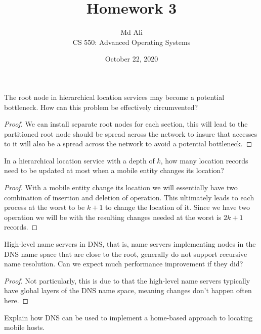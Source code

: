 \documentclass[12pt]{article}
\newenvironment{exercise}[2][Exercise]{\begin{trivlist}
\item[\hskip \labelsep {\bfseries #1}\hskip \labelsep {\bfseries #2.}]}{\end{trivlist}}
\begin{document}
 
\title{Homework 3}
\author{Md Ali\\ 
CS 550: Advanced Operating Systems}
\date{October 22, 2020}
\maketitle

 
\begin{exercise}{1}
The root node in hierarchical location services may become a potential bottleneck. How can this problem be effectively circumvented?
\end{exercise} 

\begin{proof}
We can install separate root nodes for each section, this will lead to the partitioned root node should be spread across the network to insure that accesses to it will also be a spread across the network to avoid a potential bottleneck.
\end{proof}
 
\begin{exercise}{2}
In a hierarchical location service with a depth of $k$, how many location records need to be updated at most when a mobile entity changes its location?
\end{exercise}
 
\begin{proof}
With a mobile entity change its location we will essentially have two combination of insertion and deletion of operation. This ultimately leads to each process at the worst to be $k+1$ to change the location of it. Since we have two operation we will be with the resulting changes needed at the worst is $2k + 1$ records. 
\end{proof}

\begin{exercise}{3}
High-level name servers in DNS, that is, name servers implementing nodes in the DNS name space that are close to the root, generally do not support recursive name resolution. Can we expect much performance improvement if they did?
\end{exercise}

\begin{proof}
Not particularly, this is due to that the high-level name servers typically have global layers of the DNS name space, meaning changes don't happen often here. 
\end{proof}
 
\begin{exercise}{4}
Explain how DNS can be used to implement a home-based approach to locating mobile hosts.
\end{exercise}
\end{document}
